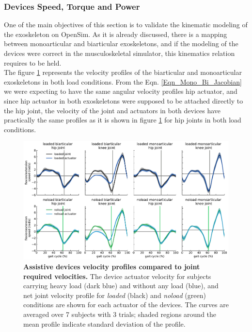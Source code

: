 \documentclass[10pt,letterpaper]{article}
\begin{document}
\subsubsection*{Devices Speed, Torque and Power}
One of the main objectives of this section is to validate the kinematic modeling of the exoskeleton on OpenSim. As it is already discussed, there is a mapping between monoarticular and biarticular exoskeletons, and if the modeling of the devices were correct in the musculoskeletal simulator, this kinematics relation requires to be held.\\
The figure \ref{Fig_IdealExo_Speed} represents the velocity profiles of the biarticular and monoarticular exoskeletons in both load conditions. From the Eqn. \eqref{Eqn_Mono_Bi_Jacobian} we were expecting to have the same angular velocity profiles hip actuator, and since hip actuator in both exoskeletons were supposed to be attached directly to the hip joint, the velocity of the joint and actuators in both devices have practically the same profiles as it is shown in figure \ref{Fig_IdealExo_Speed}  for hip joints in both load conditions.\\
\begin{figure}[ht]   
	\centering
	\includegraphics[width=\linewidth]{Ideal_Exo_MonovsBi_Figures/PaperFigure_Exoskeletons_Speed.pdf}
	\vspace{1mm}
	\caption{{\small\textbf{Assistive devices velocity profiles compared to joint required velocities.} The device actuator velocity for subjects carrying heavy load (dark blue) and without any load (blue), and net joint velocity profile for \textit{loaded} (black) and \textit{noload} (green) conditions are shown for each actuator of the devices. The curves are averaged over 7 subjects with 3 trials; shaded regions around the mean profile indicate standard deviation of the profile.}}
	\label{Fig_IdealExo_Speed}
\end{figure}
\end{document}
